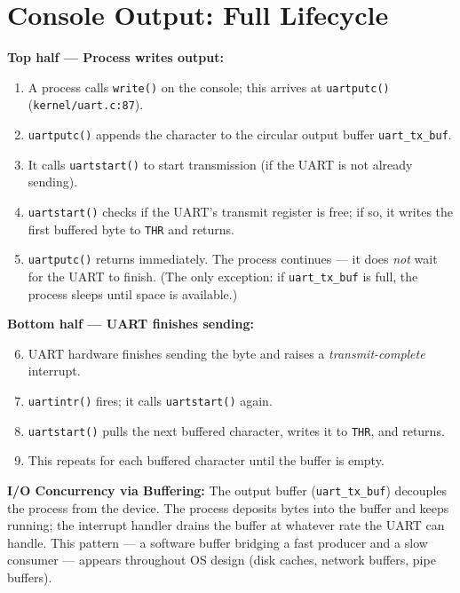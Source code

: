 \documentclass[11pt, a4paper]{article}
\begin{document}
\section{Console Output: Full Lifecycle}

\begin{tcolorbox}[lifecycle, title={Console Output Lifecycle}]
\textbf{Top half --- Process writes output:}
\begin{enumerate}[leftmargin=1.8em, itemsep=0.25em]
  \item A process calls \lstinline|write()| on the console; this arrives at \lstinline|uartputc()| (\lstinline|kernel/uart.c:87|).
  \item \lstinline|uartputc()| appends the character to the circular output buffer \lstinline|uart_tx_buf|.
  \item It calls \lstinline|uartstart()| to start transmission (if the UART is not already sending).
  \item \lstinline|uartstart()| checks if the UART's transmit register is free; if so, it writes the first buffered byte to \lstinline|THR| and returns.
  \item \lstinline|uartputc()| returns immediately. The process continues --- it does \emph{not} wait for the UART to finish. (The only exception: if \lstinline|uart_tx_buf| is full, the process sleeps until space is available.)
\end{enumerate}

\medskip
\textbf{Bottom half --- UART finishes sending:}
\begin{enumerate}[leftmargin=1.8em, itemsep=0.25em]
  \setcounter{enumi}{5}
  \item UART hardware finishes sending the byte and raises a \emph{transmit-complete} interrupt.
  \item \lstinline|uartintr()| fires; it calls \lstinline|uartstart()| again.
  \item \lstinline|uartstart()| pulls the next buffered character, writes it to \lstinline|THR|, and returns.
  \item This repeats for each buffered character until the buffer is empty.
\end{enumerate}
\end{tcolorbox}

\begin{tcolorbox}[foundational]
\textbf{I/O Concurrency via Buffering:} The output buffer (\lstinline|uart_tx_buf|) decouples the process from the device. The process deposits bytes into the buffer and keeps running; the interrupt handler drains the buffer at whatever rate the UART can handle. This pattern --- a software buffer bridging a fast producer and a slow consumer --- appears throughout OS design (disk caches, network buffers, pipe buffers).
\end{tcolorbox}
\end{document}
